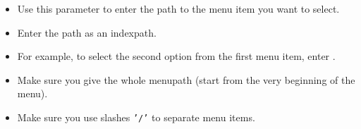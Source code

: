 \begin{itemize}
\item Use this parameter to enter the path to the menu item you want to select.
\item Enter the path as an indexpath.
\item For example, to select the second option from the first menu item, enter .
\item Make sure you give the whole menupath (start from the very beginning of the menu).
\item Make sure you use slashes {\tt '/'} to separate menu items.
 
\end{itemize}

    